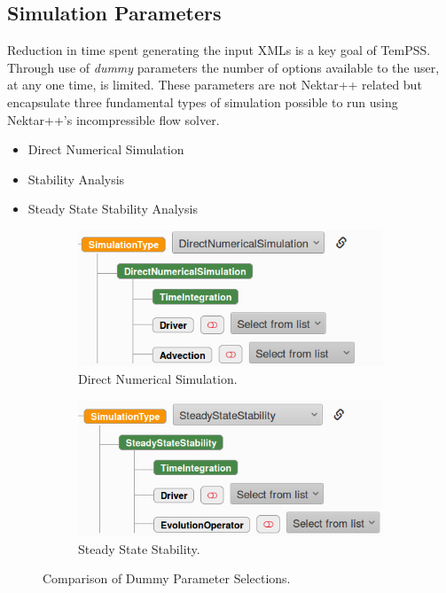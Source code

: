 \documentclass[11pt, a4paper]{report}
\begin{document}
\subsection{Simulation Parameters}
Reduction in time spent generating the input XMLs is a key goal of TemPSS. Through use of \textit{dummy} parameters the number of options available to the user, at any one time, is limited. These parameters are not Nektar++ related but encapsulate three fundamental types of simulation possible to run using Nektar++'s incompressible flow solver.
\begin{itemize}
\item Direct Numerical Simulation
\item Stability Analysis
\item Steady State Stability Analysis
\end{itemize}

\begin{figure}[!htb]
\centering
\begin{subfigure}{.5\textwidth}
  \centering
  \includegraphics[width=1\linewidth]{dns}
  \caption{Direct Numerical Simulation.}
  \label{fig:dummy_dns}
\end{subfigure}%
\begin{subfigure}{.5\textwidth}
  \centering
  \includegraphics[width=1\linewidth]{steady_stability}
  \caption{Steady State Stability.}
  \label{fig:dummy_steady_state}
\end{subfigure}
\caption{Comparison of Dummy Parameter Selections.}
\label{fig:dummy_params}
\end{figure}
\end{document}
